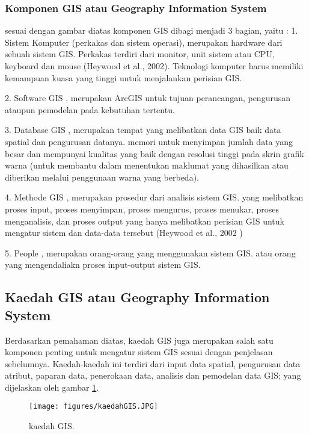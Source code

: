 \subsubsection{Komponen GIS atau Geography Information System}
sesuai dengan gambar diatas komponen GIS dibagi menjadi 3 bagian, yaitu :
1. Sistem Komputer (perkakas dan sistem operasi), merupakan hardware dari sebuah sistem GIS. Perkakas terdiri dari monitor, unit sistem atau CPU, keyboard dan mouse (Heywood et al., 2002). Teknologi komputer harus memiliki kemampuan kuasa
yang tinggi untuk menjalankan perisian GIS.

2. Software GIS , merupakan ArcGIS untuk tujuan perancangan, pengurusan ataupun pemodelan pada kebutuhan tertentu.

3. Database GIS , merupakan tempat yang melibatkan data GIS baik data spatial dan pengurusan datanya. memori untuk menyimpan jumlah data yang besar dan mempunyai kualitas yang baik dengan resolusi tinggi pada skrin grafik warna (untuk membantu dalam menentukan maklumat yang dihasilkan atau diberikan melalui penggunaan warna yang berbeda).

4. Methode GIS , merupakan prosedur dari analisis sistem GIS. yang melibatkan proses input, proses menyimpan, proses mengurus, proses menukar, proses menganalisis, dan proses output yang hanya melibatkan perisian GIS untuk mengatur sistem dan data-data tersebut (Heywood et al., 2002 )

5. People , merupakan orang-orang yang menggunakan sistem GIS. atau orang yang mengendaliakn proses input-output sistem GIS. 

\subsection{Kaedah GIS atau Geography Information System}
Berdasarkan pemahaman diatas, kaedah GIS juga merupakan salah satu komponen penting untuk mengatur sistem GIS sesuai dengan penjelasan sebelumnya. Kaedah-kaedah ini terdiri dari input
data spatial, pengurusan data atribut, paparan data, penerokaan data, analisis dan pemodelan data GIS;
yang dijelaskan oleh gambar \ref{kaedahGIS}.
\begin{figure}[ht]
	\centerline{\texttt{[image: figures/kaedahGIS.JPG]}}
	\caption{kaedah GIS.}
	\label{kaedahGIS}
	\end{figure}

